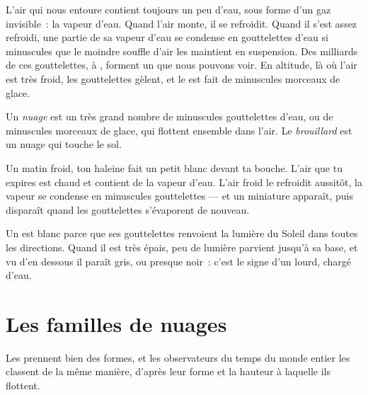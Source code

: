 L'air qui nous entoure contient toujours un peu d'eau, sous forme d'un gaz
invisible~: la vapeur d'eau. Quand l'air monte, il se refroidit. Quand il
s'est assez refroidi, une partie de sa vapeur d'eau se condense en
gouttelettes d'eau si minuscules que le moindre souffle d'air les maintient
en suspension. Des milliards de ces gouttelettes,  à , forment un
 que nous pouvons voir. En altitude, là où l'air est très froid, les
gouttelettes gèlent, et le  est fait de minuscules morceaux de glace.

\begin{definition}\label{def:g4:clouds-rain-snow:cloud}
Un \emph{nuage} est un très grand nombre de minuscules
gouttelettes d'eau, ou de minuscules morceaux de glace, qui flottent
ensemble dans l'air. Le \emph{brouillard} est un nuage
qui touche le sol.
\end{definition}

\begin{example}\label{ex:g4:clouds-rain-snow:breath}
Un matin froid, ton haleine fait un petit  blanc devant ta bouche.
L'air que tu expires est chaud et contient de la vapeur d'eau. L'air froid
le refroidit aussitôt, la vapeur se condense en minuscules gouttelettes ---
et un  miniature apparaît, puis disparaît quand les gouttelettes
s'évaporent de nouveau.
\end{example}

Un  est blanc parce que ses gouttelettes renvoient la lumière du
Soleil dans toutes les directions. Quand il est très épais, peu de lumière
parvient jusqu'à sa base, et vu d'en dessous il paraît gris, ou presque
noir~: c'est le signe d'un  lourd, chargé d'eau.

\section{Les familles de nuages}

Les  prennent bien des formes, et les observateurs du temps du monde
entier les classent de la même manière, d'après leur forme et la hauteur
à laquelle ils flottent.

